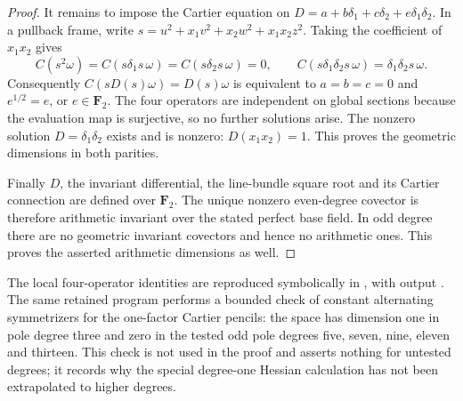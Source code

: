 \begin{proof}
It remains to impose the Cartier equation on
$D=a+b\delta_1+c\delta_2+e\delta_1\delta_2$.
In a pullback frame, write
$s=u^2+x_1v^2+x_2w^2+x_1x_2z^2$.
Taking the coefficient of $x_1x_2$ gives
\[
 C(s^2\omega)=C(s\delta_1s\,\omega)
 =C(s\delta_2s\,\omega)=0,
 \qquad C(s\delta_1\delta_2s\,\omega)=\delta_1\delta_2s\,\omega.
\]
Consequently $C(sD(s)\omega)=D(s)\omega$ is equivalent to
$a=b=c=0$ and $e^{1/2}=e$, or $e\in\mathbf F_2$.
The four operators are independent on global sections because
the evaluation map is surjective, so no further solutions arise.
The nonzero solution $D=\delta_1\delta_2$ exists and is nonzero:
$D(x_1x_2)=1$. This proves the geometric dimensions in both parities.

Finally $D$, the invariant differential, the line-bundle square root
and its Cartier connection are defined over $\mathbf F_2$.
The unique nonzero even-degree covector is therefore arithmetic
invariant over the stated perfect base field. In odd degree there
are no geometric invariant covectors and hence no arithmetic ones.
This proves the asserted arithmetic dimensions as well.
\end{proof}

\begin{remark}
The local four-operator identities are reproduced symbolically in
,
with output
.
The same retained program performs a bounded check of constant
alternating symmetrizers for the one-factor Cartier pencils: the
space has dimension one in pole degree three and zero in the tested
odd pole degrees five, seven, nine, eleven and thirteen. This check
is not used in the proof and asserts nothing for untested degrees;
it records why the special degree-one Hessian calculation has not
been extrapolated to higher degrees.
\end{remark}
